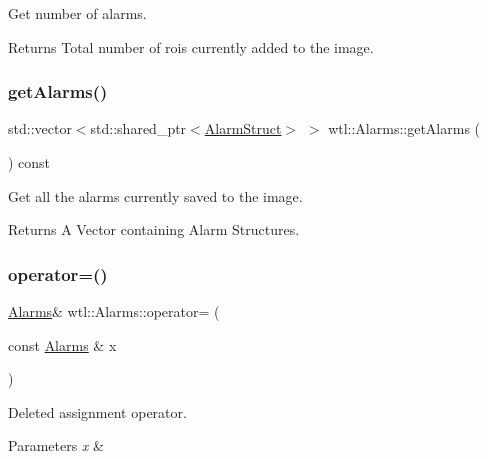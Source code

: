 Get number of alarms. 

\begin{DoxyReturn}{Returns}
Total number of rois currently added to the image. 
\end{DoxyReturn}
\mbox{\label{classwtl_1_1_alarms_a1e4f5043ef627b8544229890fc88097e}} 
\subsubsection{\texorpdfstring{get\+Alarms()}{getAlarms()}}
{\footnotesize\ttfamily std\+::vector$<$std\+::shared\+\_\+ptr$<$\hyperlink{structwtl_1_1_alarm_struct}{Alarm\+Struct}$>$ $>$ wtl\+::\+Alarms\+::get\+Alarms (\begin{DoxyParamCaption}{ }\end{DoxyParamCaption}) const}



Get all the alarms currently saved to the image. 

\begin{DoxyReturn}{Returns}
A Vector containing Alarm Structures. 
\end{DoxyReturn}
\mbox{\label{classwtl_1_1_alarms_ac110daa351bdd500a2a858657751cef9}} 
\subsubsection{\texorpdfstring{operator=()}{operator=()}}
{\footnotesize\ttfamily \hyperlink{classwtl_1_1_alarms}{Alarms}\& wtl\+::\+Alarms\+::operator= (\begin{DoxyParamCaption}\item[{const \hyperlink{classwtl_1_1_alarms}{Alarms} \&}]{x }\end{DoxyParamCaption})\hspace{0.3cm}{\ttfamily [delete]}}



Deleted assignment operator. 


\begin{DoxyParams}{Parameters}
{\em x} & \\
\hline
\end{DoxyParams}
